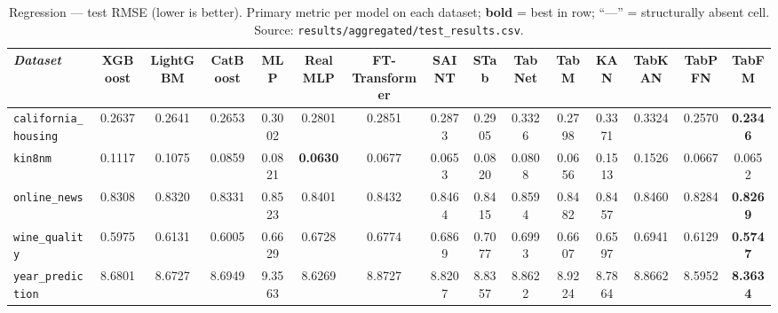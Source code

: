 \begin{landscape}
\begin{table}[htbp]
\centering
\scriptsize
\setlength{\tabcolsep}{3pt}
\caption[Regression --- complete results]{Regression --- test RMSE (lower is better). Primary metric per model on each dataset; \textbf{bold} = best in row; ``---'' = structurally absent cell. Source: \texttt{results/\allowbreak aggregated/\allowbreak test\_\allowbreak results.\allowbreak csv}.}
\label{tab:app-regressao}
\begin{tabular}{lcccccccccccccc}
\toprule
\emph{Dataset} & XGBoost & LightGBM & CatBoost & MLP & RealMLP & FT-Transformer & SAINT & STab & TabNet & TabM & KAN & TabKAN & TabPFN & TabFM \\
\midrule
\texttt{california\_\allowbreak housing} & 0.2637 & 0.2641 & 0.2653 & 0.3002 & 0.2801 & 0.2851 & 0.2873 & 0.2905 & 0.3326 & 0.2798 & 0.3371 & 0.3324 & 0.2570 & \textbf{0.2346} \\
\texttt{kin8nm} & 0.1117 & 0.1075 & 0.0859 & 0.0821 & \textbf{0.0630} & 0.0677 & 0.0653 & 0.0820 & 0.0808 & 0.0656 & 0.1513 & 0.1526 & 0.0667 & 0.0652 \\
\texttt{online\_news} & 0.8308 & 0.8320 & 0.8331 & 0.8523 & 0.8401 & 0.8432 & 0.8464 & 0.8415 & 0.8594 & 0.8482 & 0.8457 & 0.8460 & 0.8284 & \textbf{0.8269} \\
\texttt{wine\_quality} & 0.5975 & 0.6131 & 0.6005 & 0.6629 & 0.6728 & 0.6774 & 0.6869 & 0.7077 & 0.6993 & 0.6607 & 0.6597 & 0.6941 & 0.6129 & \textbf{0.5747} \\
\texttt{year\_\allowbreak prediction} & 8.6801 & 8.6727 & 8.6949 & 9.3563 & 8.6269 & 8.8727 & 8.8207 & 8.8357 & 8.8622 & 8.9224 & 8.7864 & 8.8662 & 8.5952 & \textbf{8.3634} \\
\bottomrule
\end{tabular}
\end{table}

\end{landscape}

